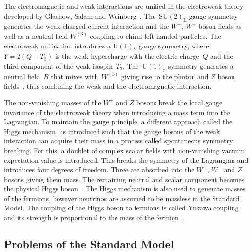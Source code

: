 The electromagnetic and weak interactions are unified in the electroweak theory
developed by Glashow, Salam and Weinberg~\cite{glashow, salam, weinberg}.
The~$\mathrm{SU}(2)_\text{L}$ gauge symmetry generates the weak charged-current
interaction and the $W^+$, $W^-$ boson fields as well as a neutral field
$W^{(3)}$ coupling to chiral left-handed particles. The electroweak unification
introduces a $\mathrm{U}(1)_Y$ gauge symmetry, where~$Y = 2 (Q - T_3)$ is the
weak hypercharge with the electric charge~$Q$ and the third component of the
weak isospin~$T_3$. The~$\mathrm{U}(1)_Y$ symmetry generates a neutral field~$B$
that mixes with~$W^{(3)}$ giving rise to the photon and $Z$ boson
fields~\cite{thomson}, thus combining the weak and the electromagnetic
interaction.

The non-vanishing masses of the $W^\pm$ and $Z$ bosons break the local gauge
invariance of the electroweak theory when introducing a mass term into the
Lagrangian. To maintain the gauge principle, a different approach called the
Higgs mechanism~\cite{englert_brout, higgs} is introduced such that the gauge
bosons of the weak interaction can acquire their mass in a process called
spontaneous symmetry breaking. For this, a doublet of complex scalar fields with
non-vanishing vacuum expectation value is introduced. This breaks the symmetry
of the Lagrangian and introduces four degrees of freedom. Three are absorbed
into the $W^+$, $W^-$ and $Z$ bosons giving them mass. The remaining neutral and
scalar component becomes the physical Higgs boson~\cite{thomson}. The Higgs
mechanism is also used to generate masses of the fermions, however neutrinos are
assumed to be massless in the Standard Model. The coupling of the Higgs boson to
fermions is called Yukawa coupling and its strength is proportional to the mass
of the fermion~\cite{thomson}.

\subsection{Problems of the Standard Model}

